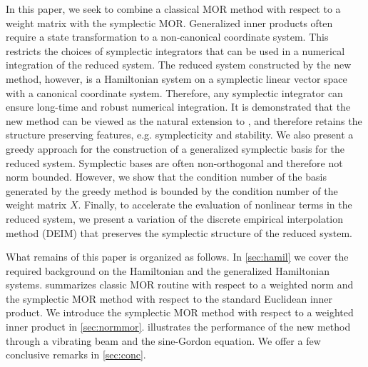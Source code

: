 In this paper, we seek to combine a classical MOR method with respect to a weight matrix with the symplectic MOR. Generalized inner products often require a state transformation to a non-canonical coordinate system. This restricts the choices of symplectic integrators that can be used in a numerical integration of the reduced system. The reduced system constructed by the new method, however, is a Hamiltonian system on a symplectic linear vector space with a canonical coordinate system. Therefore, any symplectic integrator can ensure long-time and robust numerical integration. It is demonstrated that the new method can be viewed as the natural extension to \cite{doi:10.1137/17M1111991}, and therefore retains the structure preserving features, e.g. symplecticity and stability. We also present a greedy approach for the construction of a generalized symplectic basis for the reduced system. Symplectic bases are often non-orthogonal and therefore not norm bounded. However, we show that the condition number of the basis generated by the greedy method is bounded by the condition number of the weight matrix $X$. Finally, to accelerate the evaluation of nonlinear terms in the reduced system, we present a variation of the discrete empirical interpolation method (DEIM) that preserves the symplectic structure of the reduced system.

What remains of this paper is organized as follows. In \cref{sec:hamil} we cover the required background on the Hamiltonian and the generalized Hamiltonian systems.  summarizes classic MOR routine with respect to a weighted norm and the symplectic MOR method with respect to the standard Euclidean inner product. We introduce the symplectic MOR method with respect to a weighted inner product in \cref{sec:normmor}.  illustrates the performance of the new method through a vibrating beam and the sine-Gordon equation. We offer a few conclusive remarks in \cref{sec:conc}.
